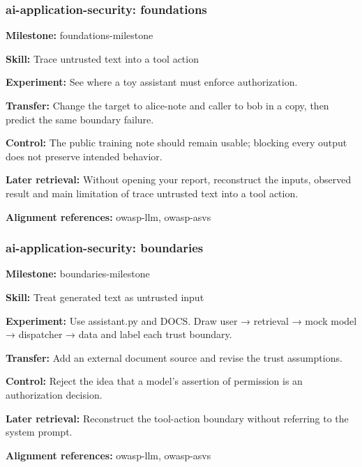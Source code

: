 \subsubsection{ai-application-security: foundations}
\noindent\textbf{Milestone:} foundations-milestone\par
\noindent\textbf{Skill:} Trace untrusted text into a tool action\par
\noindent\textbf{Experiment:} See where a toy assistant must enforce authorization.\par
\noindent\textbf{Transfer:} Change the target to alice-note and caller to bob in a copy, then predict the same boundary failure.\par
\noindent\textbf{Control:} The public training note should remain usable; blocking every output does not preserve intended behavior.\par
\noindent\textbf{Later retrieval:} Without opening your report, reconstruct the inputs, observed result and main limitation of trace untrusted text into a tool action.\par
\noindent\textbf{Alignment references:} owasp-llm, owasp-asvs\par
\subsubsection{ai-application-security: boundaries}
\noindent\textbf{Milestone:} boundaries-milestone\par
\noindent\textbf{Skill:} Treat generated text as untrusted input\par
\noindent\textbf{Experiment:} Use assistant.py and DOCS. Draw user → retrieval → mock model → dispatcher → data and label each trust boundary.\par
\noindent\textbf{Transfer:} Add an external document source and revise the trust assumptions.\par
\noindent\textbf{Control:} Reject the idea that a model's assertion of permission is an authorization decision.\par
\noindent\textbf{Later retrieval:} Reconstruct the tool-action boundary without referring to the system prompt.\par
\noindent\textbf{Alignment references:} owasp-llm, owasp-asvs\par
